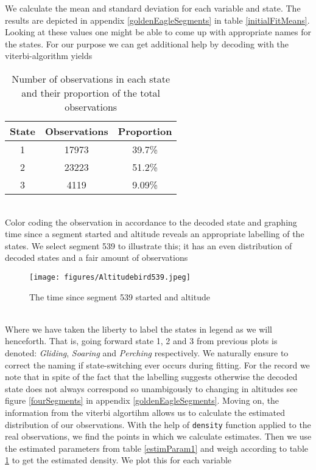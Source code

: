 We calculate the mean and standard deviation for each variable and state. The results are depicted in appendix \ref{goldenEagleSegments} in table \ref{initialFitMeans}. Looking at these values one might be able to come up with appropriate names for the states. For our purpose we can get additional help by decoding with the viterbi-algorithm yields
\begin{table}[h]
    \centering
    \begin{tabular}{ccc}
        \hline
        \textbf{State} & \textbf{Observations} & \textbf{Proportion} \\
        \hline
        1 & 17973 & 39.7\% \\
        2 & 23223 & 51.2\% \\
        3 & 4119 & 9.09\% \\
        \hline
    \end{tabular}
    \caption{Number of observations in each state and their proportion of the total observations}
    \label{estimWeight1}
\end{table}\\
Color coding the observation in accordance to the decoded state and graphing time since a segment started and altitude reveals an appropriate labelling of the states. We select segment 539 to illustrate this; it has an even distribution of decoded states and a fair amount of observations
\begin{figure}[h]
    \begin{center}
        \texttt{[image: figures/Altitudebird539.jpeg]}
    \end{center}
    \caption{The time since segment 539 started and altitude}
\end{figure}\\
Where we have taken the liberty to label the states in legend as we will henceforth. That is,
going forward state 1, 2 and 3 from previous plots is denoted: \textit{Gliding}, \textit{Soaring} and \textit{Perching} respectively. We naturally ensure to correct the naming if state-switching ever occurs during fitting. For the record we note that in spite of the fact that the labelling suggests otherwise the decoded state does not always correspond so unambigously to changing in altitudes see figure \ref{fourSegments} in appendix \ref{goldenEagleSegments}.
Moving on, the information from the viterbi algortihm allows us to calculate the estimated distribution of our observations. With the help of \texttt{density} function \cite{RLang} applied to the real observations, we find the points in which we calculate estimates. Then we use the estimated parameters from table \ref{estimParam1} and weigh according to table \ref{estimWeight1} to get the estimated density. We plot this for each variable
